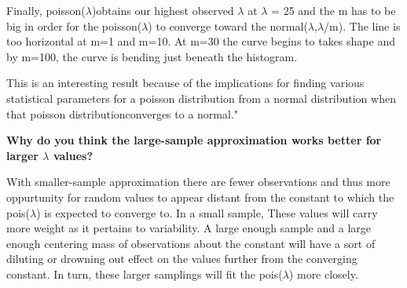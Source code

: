 \documentclass[
]{article}
\begin{document}
Finally, poisson(\(\lambda\))obtains our highest observed \(\lambda\) at
\(\lambda\) = 25 and the m has to be big in order for the
poisson(\(\lambda\)) to converge toward the
normal(\(\lambda\),\(\lambda\)/m). The line is too horizontal at m=1 and
m=10. At m=30 the curve begins to takes shape and by m=100, the curve is
bending just beneath the histogram.

This is an interesting result because of the implications for finding
various statistical parameters for a poisson distribution from a normal
distribution when that poisson distributionconverges to a normal."

\textbf{Why do you think the large-sample approximation works better for
larger \(\lambda\) values?}

With smaller-sample approximation there are fewer observations and thus
more oppurtunity for random values to appear distant from the constant
to which the pois(\(\lambda\)) is expected to converge to. In a small
sample, These values will carry more weight as it pertains to
variability. A large enough sample and a large enough centering mass of
observations about the constant will have a sort of diluting or drowning
out effect on the values further from the converging constant. In turn,
these larger samplings will fit the pois(\(\lambda\)) more closely.
\end{document}
